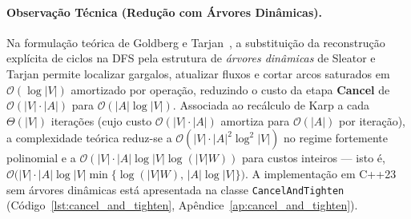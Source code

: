 \paragraph{Observação Técnica (Redução com Árvores Dinâmicas).}
Na formulação teórica de Goldberg e Tarjan~\cite{goldberg1989finding}, a substituição da reconstrução explícita de ciclos na DFS pela estrutura de \emph{árvores dinâmicas} de Sleator e Tarjan permite localizar gargalos, atualizar fluxos e cortar arcos saturados em $\mathcal{O}(\log |V|)$ amortizado por operação, reduzindo o custo da etapa \textbf{Cancel} de $\mathcal{O}(|V| \cdot |A|)$ para $\mathcal{O}(|A| \log |V|)$. Associada ao recálculo de Karp a cada $\Theta(|V|)$ iterações (cujo custo $\mathcal{O}(|V|\cdot|A|)$ amortiza para $\mathcal{O}(|A|)$ por iteração), a complexidade teórica reduz-se a $\mathcal{O}(|V| \cdot |A|^2 \log^2 |V|)$ no regime fortemente polinomial e a $\mathcal{O}(|V| \cdot |A| \log |V| \log(|V|W))$ para custos inteiros — isto é, $\mathcal{O}\bigl(|V| \cdot |A| \log |V| \min\{\log(|V|W),\, |A|\log |V|\}\bigr)$. A implementação em C++23 sem árvores dinâmicas está apresentada na classe \lstinline{CancelAndTighten} (Código~\ref{lst:cancel_and_tighten}, Apêndice~\ref{ap:cancel_and_tighten}).
